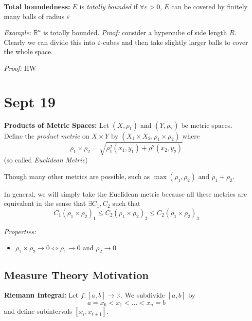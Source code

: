 \documentclass[12pt]{article}
\newcommand{\R}{\mathbb{R}}
\newcommand{\ep}{\varepsilon}
\newcommand{\sub}{\subseteq}
\newenvironment*{tbox}[2][gray]{
    \begin{tcolorbox}[
        parbox=false,
        colback=#1!5!white,
        colframe=#1!75!black,
        breakable,
        title={#2}
    ]}
    {\end{tcolorbox}}
\begin{document}
    \textbf{Total boundedness:} $E$ is \emph{totally bounded} if $\forall \ep > 0$, $E$ can be covered by finitely many balls of radius $\ep$

    \emph{Example:} $\R^n$ is totally bounded. \emph{Proof:} consider a hypercube of side length $R$. Clearly we can divide this into $\ep$-cubes and then take slightly larger balls to cover the whole space.

    \begin{tbox}{\textbf{Theorem (Characterization of Compactness):} The following are equivalent: 
        \begin{enumerate}
            \item $E$ is complete and totally bounded
            \item Every sequence in $E$ has a convergent subsequence with its limit in $E$
            \item If $\{V_{\alpha}\}_{\alpha \in A}$ is an open cover of $E$, then there exists a finite set $F \sub A$ such that $\{U_{\alpha}\}_{\alpha \in F}$ covers $E$
        \end{enumerate}}
        \emph{Proof:} HW
    \end{tbox}

\section{Sept 19}
    \textbf{Products of Metric Spaces:} Let $(X, \rho_1)$ and $(Y, \rho_2)$ be metric spaces. Define the \emph{product metric} on $X \times Y$ by $(X_1 \times X_2, \rho_1 \times \rho_2)$ where
    \[\rho_1 \times \rho_2 = \sqrt{\rho_1^2(x_1, y_1) + \rho^2(x_2, y_2)}\]
    (so called \emph{Euclidean Metric})

    Though many other metrics are possible, such as $\max(\rho_1, \rho_2)$ and $\rho_1 + \rho_2$. 

    In general, we will simply take the Euclidean metric because all these metrics are equivalent in the sense that $\exists C_1, C_2$ such that 
    \[C_1(\rho_1 \times \rho_2)_1 \leq C_2(\rho_1 \times \rho_2)_2 \leq C_2(\rho_1 \times \rho_2)_3\]

    \emph{Properties:}
    \begin{itemize}
        \item $\rho_1 \times \rho_2 \to 0 \iff \rho_1 \to 0$ and $\rho_2 \to 0$
    \end{itemize}

    \subsection*{Measure Theory Motivation}
        \textbf{Riemann Integral:} Let $f: [a, b] \to \R$. We subdivide $[a, b]$ by 
        \[a = x_0 < x_1 < \dots < x_n = b\]
        and define subintervals $[x_i, x_{i+1}]$. 
\end{document}
